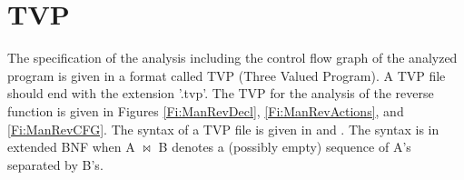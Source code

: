 \section{\label{Se:TVPMan}TVP}

\renewcommand{\impliesT}{\ \makebox{\tt ==>}\ }
\newcommand{\blp}{$\boldsymbol{(}$}
\newcommand{\brp}{$\boldsymbol{)}$}
\newcommand{\blcb}{\textbf{\{}}
\newcommand{\brcb}{\textbf{\}}}
\newcommand{\blb}{$\boldsymbol{[}$}
\newcommand{\brb}{$\boldsymbol{]}$}
\newcommand{\lb}{$[$}
\newcommand{\rb}{$]$}
\newcommand{\bor}{{\bf {\tt |}}}
\newcommand{\band}{\textbf{\&}}
\newcommand{\beq}{\textbf{==}}
\newcommand{\bassign}{\textbf{=}}
\newcommand{\bnot}{\textbf{!}}
\newcommand{\bneq}{\textbf{!=}}
\newcommand{\bcomma}{\textbf{,}}
\newcommand{\pformula}{\param{formula}}
\newcommand{\pvar}{\param{var}}
\newcommand{\var}{\param{var}}
\newcommand{\pid}{\param{id}}
\newcommand{\ppred}{\param{pred}}
\newcommand{\csep}[1]{#1$\bowtie$\bcomma}
\newcommand{\nvars}{\blp\ \csep{\var}\ \brp}
\newcommand{\twovars}{\blp\ \var\ \bcomma\ \var\ \brp}



The specification of the analysis including the control flow graph
of the analyzed program is given in a format called TVP (Three
Valued Program). A TVP file should end with the extension '.tvp'.
The TVP for the analysis of the reverse function is given in
Figures \ref{Fi:ManRevDecl}, \ref{Fi:ManRevActions}, and
\ref{Fi:ManRevCFG}. The syntax of a TVP file is given in
 and . The syntax is in extended BNF when A $\bowtie$
B denotes a (possibly empty) sequence of A's separated by B's.

